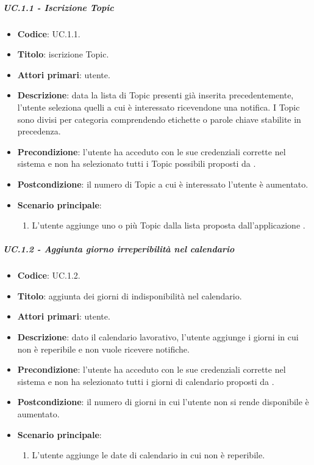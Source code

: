 	\subparagraph{UC\theuccount.1.1 - Iscrizione Topic}
	\begin{itemize}
		\item \textbf{Codice}: UC\theuccount.1.1.
		\item \textbf{Titolo}: iscrizione Topic.
		\item \textbf{Attori primari}: utente.
		\item \textbf{Descrizione}: data la lista di Topic presenti già inserita precedentemente, l'utente seleziona quelli a cui è interessato ricevendone una notifica. I Topic sono divisi per categoria comprendendo etichette o parole chiave stabilite in precedenza.
		\item \textbf{Precondizione}: l'utente ha acceduto con le sue credenziali corrette nel sistema e non ha selezionato tutti i Topic possibili proposti da \progetto.
		\item \textbf{Postcondizione}: il numero di Topic a cui è interessato l'utente è aumentato.
		\item \textbf{Scenario principale}:
		\begin{enumerate}
			\item L'utente aggiunge uno o più Topic dalla lista proposta dall'applicazione \progetto.
		\end{enumerate}
	\end{itemize}
		
			
	\subparagraph{UC\theuccount.1.2 - Aggiunta giorno irreperibilità nel calendario} 
	\begin{itemize}
		\item \textbf{Codice}: UC\theuccount.1.2.
		\item \textbf{Titolo}: aggiunta dei giorni di indisponibilità nel calendario.
		\item \textbf{Attori primari}: utente.
		\item \textbf{Descrizione}: dato il calendario lavorativo, l'utente aggiunge i giorni in cui non è reperibile e non vuole ricevere notifiche.
		\item \textbf{Precondizione}: l'utente ha acceduto con le sue credenziali corrette nel sistema e non ha selezionato tutti i giorni di calendario proposti da \progetto.
		\item \textbf{Postcondizione}: il numero di giorni in cui l'utente non si rende disponibile è aumentato.
		\item \textbf{Scenario principale}:
		\begin{enumerate}
			\item L'utente aggiunge le date di calendario in cui non è reperibile.
		\end{enumerate}
	\end{itemize}
			
